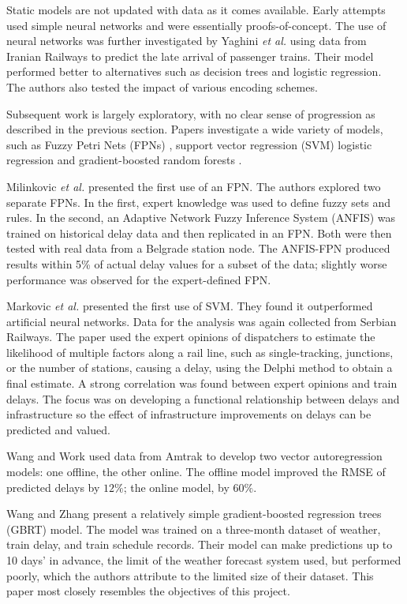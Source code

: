 \documentclass[12pt,a4paper]{article}
\begin{document}
Static models are not updated with data as it comes available. Early attempts used simple neural networks \cite{peters_et_al_2005} and were essentially proofs-of-concept. The use of neural networks was further investigated by Yaghini \textit{et al.} \cite{yaghini_et_al_2013} using data from Iranian Railways to predict the late arrival of passenger trains. Their model performed better to alternatives such as decision trees and logistic regression. The authors also tested the impact of various encoding schemes. 

Subsequent work is largely exploratory, with no clear sense of progression as described in the previous section. Papers investigate a wide variety of models, such as Fuzzy Petri Nets (FPNs) \cite{milinkovic_et_al_2013}, support vector regression (SVM) \cite{markovic_et_al_2015} logistic regression \cite{wang_work_2015} and gradient-boosted random forests \cite{wang__and_zhang_2015}.

Milinkovic \textit{et al.} \cite{milinkovic_et_al_2013} presented the first use of an FPN. The authors explored two separate FPNs. In the first, expert knowledge was used to define fuzzy sets and rules. In the second, an Adaptive Network Fuzzy Inference System (ANFIS) was trained on historical delay data and then replicated in an FPN. Both were then tested with real data from a Belgrade station node. The ANFIS-FPN produced results within 5\% of actual delay values for a subset of the data; slightly worse performance was observed for the expert-defined FPN.

Markovic \textit{et al.} \cite{markovic_et_al_2015} presented the first use of SVM. They found it outperformed artificial neural networks. Data for the analysis was again collected from Serbian Railways. The paper used the expert opinions of dispatchers to estimate the likelihood of multiple factors along a rail line, such as single-tracking, junctions, or the number of stations, causing a delay, using the Delphi method to obtain a final estimate. A strong correlation was found between expert opinions and train delays. The focus was on developing a functional relationship between delays and infrastructure so the effect of infrastructure improvements on delays can be predicted and valued.  

Wang and Work \cite{wang_work_2015} used data from Amtrak to develop two vector autoregression models: one offline, the other online. The offline model improved the RMSE of predicted delays by $12\%$; the online model, by $60\%$.

Wang and Zhang \cite{wang_zhang_2019} present a relatively simple gradient-boosted regression trees (GBRT) model. The model was trained on a three-month dataset of weather, train delay, and train schedule records. Their model can make predictions up to 10 days’ in advance, the limit of the weather forecast system used, but performed poorly, which the authors attribute to the limited size of their dataset. This paper most closely resembles the objectives of this project. 
\end{document}

